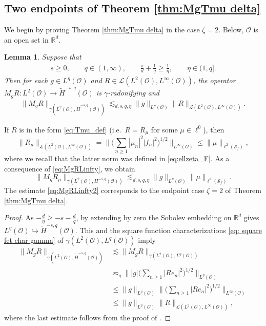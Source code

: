 \documentclass[reqno]{amsart}
\theoremstyle{plain}
\theoremstyle{remark}
\theoremstyle{plain}
\newtheorem{lemma}[theorem]{Lemma}
\numberwithin{equation}{section}
\newcommand\calL{\mathcal{L}}
\newcommand\cO{\mathcal{O}}
\def\R{{\mathbb R}}
\newcommand{\g}{\gamma}
\newcommand{\Domm}{\mathcal{O}}
\newcommand{\wt}{\widetilde}
\newcommand{\1}{\one}
\newcommand{\embed}{\hookrightarrow}
\newcommand{\Sf}{\mathcal{S}_{f}}
\begin{document}
\subsection{Two endpoints of Theorem \ref{thm:MgTmu delta}}
\label{ss:endpoint_case_main_result}
We begin by proving Theorem \ref{thm:MgTmu delta} in the case $\zeta=2$.
Below, $\Domm$ is an open set in $\R^d$. 



\begin{lemma}
\label{lem:l2 2 delta}
Suppose that
\begin{align}
\label{eq: bound l2 2 delta}
s\geq 0, \qquad q\in (1, \infty), \qquad   \frac{s}{d} + \frac{1}{q} \geq \frac{1}{\eta}, \qquad  \eta\in (1, q]. 
\end{align}
Then for each $g\in L^{\eta}(\mathcal{O})$ and $R\in \calL(L^2(\cO), L^\infty(\cO))$, the operator $M_g R:L^2(\mathcal{O})\to \wt{H}^{-s,q}(\mathcal{O})$ is $\gamma$-radonifying and 
\begin{align}\label{eq:MgRLinfty}
\|M_g R\|_{\gamma(L^2(\mathcal{O}), \wt{H}^{-s,q}(\mathcal{O}))}\lesssim_{d,s,q,\eta}
\|g\|_{L^\eta(\mathcal{O})} \|R\|_{\calL(L^2(\cO), L^\infty(\cO))}.
\end{align}
\end{lemma}

If $R$ is in the form \eqref{eq:Tmu_def} (i.e.\ $R=R_\mu$ for some $\mu\in \ell^0$), then 
\[\|R_{\mu}\|_{\calL(L^2(\cO), L^\infty(\cO))} = \Big\|\Big(\sum_{n\geq 1} |\mu_n|^2 |f_n|^2\Big)^{1/2} \Big\|_{L^\infty(\cO)}\leq \|\mu\|_{\ell^2(\Sf)},\]
where we recall that the latter norm was defined in \eqref{eq:ellzeta_F}. As a consequence of \eqref{eq:MgRLinfty}, we obtain 
\begin{equation}\label{eq:MgRLinfty2}
\|M_g R_{\mu}\|_{\gamma(L^2(\mathcal{O}),H^{-s,q}(\mathcal{O}))}\lesssim_{d,s,q,\eta}
\|g\|_{L^\eta(\mathcal{O})} \|\mu\|_{\ell^2(\Sf)}.
\end{equation}
The estimate \eqref{eq:MgRLinfty2} corresponds to the  endpoint case $\zeta=2$ of Theorem \ref{thm:MgTmu delta}. 


\begin{proof}
As $- \frac{d}{\eta}\geq -s -\frac{d}{q}$, by extending by zero the Sobolev embedding on $\R^d$ gives $L^\eta(\Domm)\embed \wt{H}^{-s,q}(\Domm)$. This and the square function characterizations \eqref{eq: square fct char gamma} of $\g(L^2(\Domm),L^q(\Domm))$ imply 
\begin{align*}
  \|M_g R\|_{\gamma(L^2(\mathcal{O}),\wt{H}^{-s,q}(\mathcal{O}))} & \lesssim \|M_g R\|_{\gamma(L^2(\mathcal{O}),L^\eta(\mathcal{O}))} \\ 
  & \eqsim_q  \Big\||g| \Big(\sum_{n\geq 1} |R e_n |^2\Big)^{1/2}\Big\|_{L^\eta(\mathcal{O})}\\
  & \leq  \|g\|_{L^\eta(\Domm)} \Big\| \Big(\sum_{n\geq 1} |Re_n|^2\Big)^{1/2}\Big\|_{L^\infty(\mathcal{O})}\\
 & \leq  \|g\|_{L^\eta(\Domm)}  \|R\|_{\calL(L^2(\cO), L^\infty(\cO))},
\end{align*}
where the last estimate follows from the proof of \cite[Corollary 9.3.3]{HNVW2}.
\end{proof}
\end{document}
